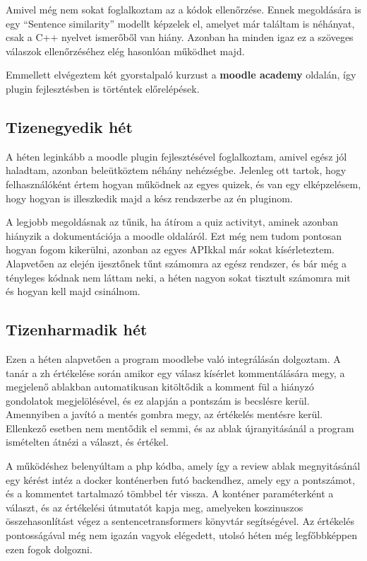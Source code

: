 \documentclass{article}
\begin{document}
Amivel még nem sokat foglalkoztam az a kódok ellenőrzése. Ennek megoldására is egy ``Sentence similarity'' modellt képzelek el, amelyet már találtam is néhányat, csak a C++ nyelvet ismerőből van hiány. Azonban ha minden igaz ez a szöveges válaszok ellenőrzéséhez elég hasonlóan működhet majd.

Emmellett elvégeztem két gyorstalpaló kurzust a \textbf{moodle academy} oldalán, így plugin fejlesztésben is történtek előrelépések.

\subsection{Tizenegyedik hét}
A héten leginkább a moodle plugin fejlesztésével foglalkoztam, amivel egész jól haladtam, azonban beleütköztem néhány nehézségbe. Jelenleg ott tartok, hogy felhasználóként értem hogyan működnek az egyes quizek, és van egy elképzelésem, hogy hogyan is illeszkedik majd a kész rendszerbe az én pluginom. 

A legjobb megoldásnak az tűnik, ha átírom a quiz activityt, aminek azonban hiányzik a dokumentációja a moodle oldaláról. Ezt még nem tudom pontosan hogyan fogom kikerülni, azonban az egyes APIkkal már sokat kísérleteztem. Alapvetően az elején ijesztőnek tűnt számomra az egész rendszer, és bár még a tényleges kódnak nem láttam neki, a héten nagyon sokat tisztult számomra mit és hogyan kell majd csinálnom.

\subsection{Tizenharmadik hét}
Ezen a héten alapvetően a program moodlebe való integrálásán dolgoztam.
A tanár a zh értékelése során amikor egy válasz kísérlet kommentálására megy, a megjelenő ablakban automatikusan kitöltődik a komment fül
a hiányzó gondolatok megjelölésével, és ez alapján a pontszám is becslésre kerül. Amennyiben a javító a mentés gombra megy, az értékelés mentésre kerül. Ellenkező esetben nem mentődik el semmi, és az ablak újranyitásánál a program ismételten átnézi a választ, és értékel.

A működéshez belenyúltam a php kódba, amely így a review ablak megnyitásánál egy kérést intéz a docker konténerben futó backendhez, amely egy a pontszámot, és a kommentet tartalmazó tömbbel tér vissza. A konténer paraméterként a választ, és az értékelési útmutatót kapja meg, amelyeken koszinuszos összehasonlítást végez a sentencetransformers könyvtár segítségével. Az értékelés pontosságával még nem igazán vagyok elégedett, utolsó héten még legfőbbképpen ezen fogok dolgozni. 
\end{document}
